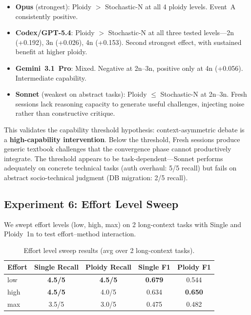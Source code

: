 \documentclass[11pt]{article}
\begin{document}
\begin{itemize}[leftmargin=1.5em]
  \item \textbf{Opus} (strongest): Ploidy $>$ Stochastic-N at all 4 ploidy levels. Event~A consistently positive.
  \item \textbf{Codex/GPT-5.4}: Ploidy $>$ Stochastic-N at all three tested levels---2n (+0.192), 3n (+0.026), 4n (+0.153). Second strongest effect, with sustained benefit at higher ploidy.
  \item \textbf{Gemini~3.1~Pro}: Mixed. Negative at 2n--3n, positive only at 4n (+0.056). Intermediate capability.
  \item \textbf{Sonnet} (weakest on abstract tasks): Ploidy $\leq$ Stochastic-N at 2n--3n. Fresh sessions lack reasoning capacity to generate useful challenges, injecting noise rather than constructive critique.
\end{itemize}

This validates the capability threshold hypothesis: context-asymmetric debate is a \textbf{high-capability intervention}. Below the threshold, Fresh sessions produce generic textbook challenges that the convergence phase cannot productively integrate. The threshold appears to be task-dependent---Sonnet performs adequately on concrete technical tasks (auth overhaul: 5/5 recall) but fails on abstract socio-technical judgment (DB migration: 2/5 recall).

\subsection{Experiment 6: Effort Level Sweep}
\label{sec:effort-sweep}

We swept effort levels (low, high, max) on 2 long-context tasks with Single and Ploidy~1n to test effort--method interaction.

\begin{table}[H]
\centering
\caption{Effort level sweep results (avg over 2 long-context tasks).}
\label{tab:effort-sweep}
\small
\begin{tabular}{@{}lcccc@{}}
\toprule
\textbf{Effort} & \textbf{Single Recall} & \textbf{Ploidy Recall} & \textbf{Single F1} & \textbf{Ploidy F1} \\
\midrule
low  & \textbf{4.5/5} & \textbf{4.5/5} & \textbf{0.679} & 0.544 \\
high & \textbf{4.5/5} & 4.0/5 & 0.634 & \textbf{0.650} \\
max  & 3.5/5 & 3.0/5 & 0.475 & 0.482 \\
\bottomrule
\end{tabular}
\end{table}
\end{document}
